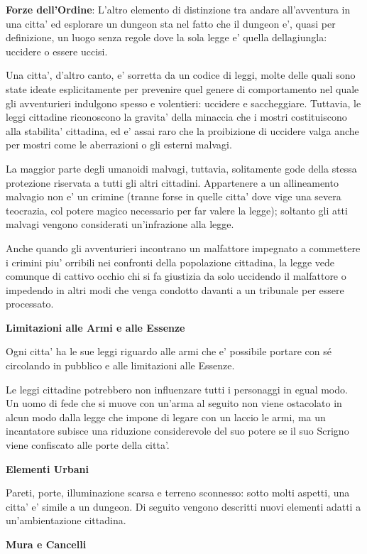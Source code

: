 \documentclass[a4paper,11pt,twoside,openany]{book}
\begin{document}
{\textbf{Forze dell'Ordine}: L'altro elemento di distinzione tra andare all'avventura in una citta' ed esplorare un dungeon sta nel fatto che il dungeon e', quasi per definizione, un luogo senza regole dove la sola legge e' quella dellagiungla: uccidere o essere uccisi.

Una citta', d'altro canto, e' sorretta da un codice di leggi, molte delle quali sono state ideate esplicitamente per prevenire quel genere di comportamento nel quale gli avventurieri indulgono spesso e volentieri: uccidere e saccheggiare. Tuttavia, le leggi cittadine riconoscono la gravita' della minaccia che i mostri costituiscono alla stabilita' cittadina, ed e' assai raro che la proibizione di uccidere valga anche per mostri come le aberrazioni o gli esterni malvagi.

La maggior parte degli umanoidi malvagi, tuttavia, solitamente gode della stessa protezione riservata a tutti gli altri cittadini. Appartenere a un allineamento malvagio non e' un crimine (tranne forse in quelle citta' dove vige una severa teocrazia, col potere magico necessario per far valere la legge); soltanto gli atti malvagi vengono considerati un'infrazione alla legge. 

Anche quando gli avventurieri incontrano un malfattore impegnato a commettere i crimini piu' orribili nei confronti della popolazione cittadina, la legge vede comunque di cattivo occhio chi si fa giustizia da solo uccidendo il malfattore o impedendo in altri modi che venga condotto davanti a un tribunale per essere processato.

\textbf{Limitazioni alle Armi e alle Essenze}

Ogni citta' ha le sue leggi riguardo alle armi che e' possibile portare con sé circolando in pubblico e alle limitazioni alle Essenze.

Le leggi cittadine potrebbero non influenzare tutti i personaggi in egual modo. Un uomo di fede che si muove con un'arma al seguito non viene ostacolato in alcun modo dalla legge che impone di legare con un laccio le armi, ma un incantatore subisce una riduzione considerevole del suo potere se il suo Scrigno viene confiscato alle porte della citta'.

\textbf{Elementi Urbani}

Pareti, porte, illuminazione scarsa e terreno sconnesso: sotto molti aspetti, una citta' e' simile a un dungeon. Di seguito vengono descritti nuovi elementi adatti a un'ambientazione cittadina.

\textbf{Mura e Cancelli}

}
\end{document}
